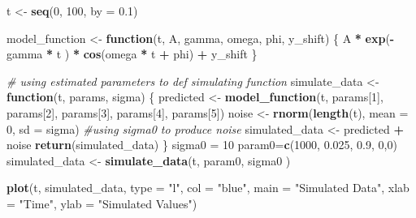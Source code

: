 \documentclass[
]{article}
\newenvironment{Shaded}{\begin{snugshade}}{\end{snugshade}}
\newcommand{\AttributeTok}[1]{\textcolor[rgb]{0.13,0.29,0.53}{#1}}
\newcommand{\CommentTok}[1]{\textcolor[rgb]{0.56,0.35,0.01}{\textit{#1}}}
\newcommand{\ControlFlowTok}[1]{\textcolor[rgb]{0.13,0.29,0.53}{\textbf{#1}}}
\newcommand{\DecValTok}[1]{\textcolor[rgb]{0.00,0.00,0.81}{#1}}
\newcommand{\FloatTok}[1]{\textcolor[rgb]{0.00,0.00,0.81}{#1}}
\newcommand{\FunctionTok}[1]{\textcolor[rgb]{0.13,0.29,0.53}{\textbf{#1}}}
\newcommand{\NormalTok}[1]{#1}
\newcommand{\OtherTok}[1]{\textcolor[rgb]{0.56,0.35,0.01}{#1}}
\newcommand{\SpecialCharTok}[1]{\textcolor[rgb]{0.81,0.36,0.00}{\textbf{#1}}}
\newcommand{\StringTok}[1]{\textcolor[rgb]{0.31,0.60,0.02}{#1}}
\begin{document}
\begin{Shaded}
\begin{Highlighting}[]
\NormalTok{t }\OtherTok{\textless{}{-}} \FunctionTok{seq}\NormalTok{(}\DecValTok{0}\NormalTok{, }\DecValTok{100}\NormalTok{, }\AttributeTok{by =} \FloatTok{0.1}\NormalTok{)}

\NormalTok{model\_function }\OtherTok{\textless{}{-}} \ControlFlowTok{function}\NormalTok{(t, A, gamma, omega, phi, y\_shift) \{}
\NormalTok{  A }\SpecialCharTok{*} \FunctionTok{exp}\NormalTok{(}\SpecialCharTok{{-}}\NormalTok{gamma }\SpecialCharTok{*}\NormalTok{ t ) }\SpecialCharTok{*} \FunctionTok{cos}\NormalTok{(omega }\SpecialCharTok{*}\NormalTok{ t }\SpecialCharTok{+}\NormalTok{ phi) }\SpecialCharTok{+}\NormalTok{ y\_shift}
\NormalTok{\}}

\CommentTok{\# using estimated parameters to def simulating function}
\NormalTok{simulate\_data }\OtherTok{\textless{}{-}} \ControlFlowTok{function}\NormalTok{(t, params, sigma) \{}
\NormalTok{  predicted }\OtherTok{\textless{}{-}} \FunctionTok{model\_function}\NormalTok{(t, params[}\DecValTok{1}\NormalTok{], params[}\DecValTok{2}\NormalTok{], params[}\DecValTok{3}\NormalTok{], params[}\DecValTok{4}\NormalTok{], params[}\DecValTok{5}\NormalTok{])}
\NormalTok{  noise }\OtherTok{\textless{}{-}} \FunctionTok{rnorm}\NormalTok{(}\FunctionTok{length}\NormalTok{(t), }\AttributeTok{mean =} \DecValTok{0}\NormalTok{, }\AttributeTok{sd =}\NormalTok{ sigma)  }\CommentTok{\#using sigma0 to produce noise }
\NormalTok{  simulated\_data }\OtherTok{\textless{}{-}}\NormalTok{ predicted }\SpecialCharTok{+}\NormalTok{ noise}
  \FunctionTok{return}\NormalTok{(simulated\_data)}
\NormalTok{\}}
\NormalTok{sigma0 }\OtherTok{=} \DecValTok{10}
\NormalTok{param0}\OtherTok{=}\FunctionTok{c}\NormalTok{(}\DecValTok{1000}\NormalTok{, }\FloatTok{0.025}\NormalTok{, }\FloatTok{0.9}\NormalTok{, }\DecValTok{0}\NormalTok{,}\DecValTok{0}\NormalTok{)}
\NormalTok{simulated\_data }\OtherTok{\textless{}{-}} \FunctionTok{simulate\_data}\NormalTok{(t, param0, sigma0 )}
\end{Highlighting}
\end{Shaded}

\begin{Shaded}
\begin{Highlighting}[]
\FunctionTok{plot}\NormalTok{(t, simulated\_data, }\AttributeTok{type =} \StringTok{"l"}\NormalTok{, }\AttributeTok{col =} \StringTok{"blue"}\NormalTok{, }\AttributeTok{main =} \StringTok{"Simulated Data"}\NormalTok{, }\AttributeTok{xlab =} \StringTok{"Time"}\NormalTok{, }\AttributeTok{ylab =} \StringTok{"Simulated Values"}\NormalTok{)}
\end{Highlighting}
\end{Shaded}
\end{document}
